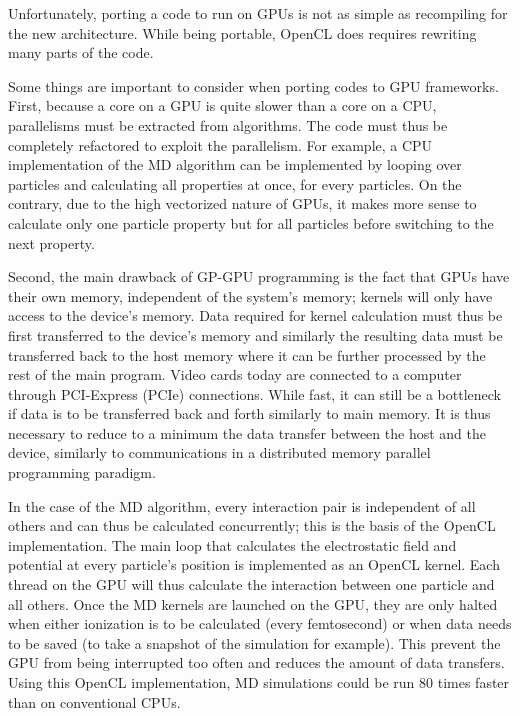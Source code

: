 Unfortunately, porting a code to run on GPUs is not as simple as recompiling
for the new architecture. While being portable, OpenCL does requires rewriting
many parts of the code.



Some things are important to consider when porting codes to GPU frameworks.
First, because a core on a GPU is quite slower than a core on a CPU,
parallelisms must be extracted from algorithms. The code must thus be
completely refactored to exploit the parallelism. For example, a CPU
implementation of the MD algorithm can be implemented by looping over particles
and calculating all properties at once, for every particles. On the contrary,
due to the high vectorized nature of GPUs, it makes more sense to calculate
only one particle property but for all particles before switching to the next
property.

Second, the main drawback of
GP-GPU programming is the fact that GPUs have their own memory, independent of
the system's memory; kernels will only have access to the device's memory. Data
required for kernel calculation must thus be first transferred to the device's
memory and similarly the resulting data must be transferred back to the host
memory where it can be further processed by the rest of the main program. Video
cards today are connected to a computer through PCI-Express (PCIe) connections.
While fast, it can still be a bottleneck if data is to be transferred back and
forth similarly to main memory. It is thus necessary to reduce to a minimum the
data transfer between the host and the device, similarly to communications in a
distributed memory parallel programming paradigm.

In the case of the MD algorithm, every interaction pair is independent of all
others and can thus be calculated concurrently; this is the basis of the
OpenCL implementation. The main loop that calculates the electrostatic field
and potential at every particle's position is implemented as an OpenCL kernel.
Each thread on the GPU will thus calculate the interaction between one particle
and all others. Once the MD kernels are launched on the GPU, they are only
halted when either ionization is to be calculated (every femtosecond) or
when data needs to be saved (to take a snapshot of the simulation for example).
This prevent the GPU from being interrupted too often and reduces the amount of
data transfers. Using this OpenCL implementation, MD simulations could be run
80 times faster than on conventional CPUs.

